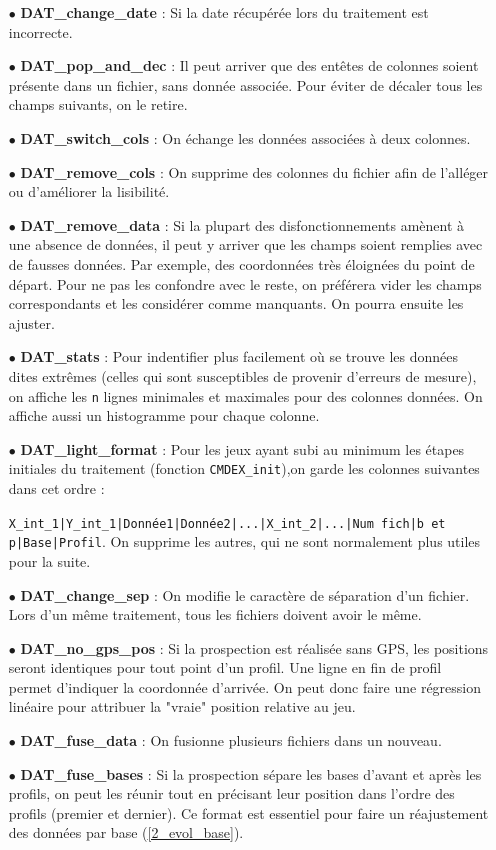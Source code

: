 \documentclass[12pt]{article}
\begin{document}
    \begin{enumerate}
        \item[$\bullet$] \textbf{DAT\_change\_date} : Si la date récupérée lors du traitement est incorrecte.
        \item[$\bullet$] \textbf{DAT\_pop\_and\_dec} : Il peut arriver que des entêtes de colonnes soient présente dans un fichier, sans donnée associée. Pour éviter de décaler tous les champs suivants, on le retire.
        \item[$\bullet$] \textbf{DAT\_switch\_cols} : On échange les données associées à deux colonnes.
        \item[$\bullet$] \textbf{DAT\_remove\_cols} : On supprime des colonnes du fichier afin de l'alléger ou d'améliorer la lisibilité.
        \item[$\bullet$] \textbf{DAT\_remove\_data} : Si la plupart des disfonctionnements amènent à une absence de données, il peut y arriver que les champs soient remplies avec de fausses données. Par exemple, des coordonnées très éloignées du point de départ. Pour ne pas les confondre avec le reste, on préférera vider les champs correspondants et les considérer comme manquants. On pourra ensuite les ajuster.
        \item[$\bullet$] \textbf{DAT\_stats} : Pour indentifier plus facilement où se trouve les données dites extrêmes (celles qui sont susceptibles de provenir d'erreurs de mesure), on affiche les \texttt{n} lignes minimales et maximales pour des colonnes données. On affiche aussi un histogramme pour chaque colonne.
        \item[$\bullet$] \textbf{DAT\_light\_format} : Pour les jeux ayant subi au minimum les étapes initiales du traitement (fonction \texttt{CMDEX\_init}),on garde les colonnes suivantes dans cet ordre : 
        
        \texttt{X\_int\_1|Y\_int\_1|Donnée1|Donnée2|...|X\_int\_2|...|Num fich|b et p|Base|Profil}. On supprime les autres, qui ne sont normalement plus utiles pour la suite.
        \item[$\bullet$] \textbf{DAT\_change\_sep} : On modifie le caractère de séparation d'un fichier. Lors d'un même traitement, tous les fichiers doivent avoir le même.
        \item[$\bullet$] \textbf{DAT\_no\_gps\_pos} : Si la prospection est réalisée sans GPS, les positions seront identiques pour tout point d'un profil. Une ligne en fin de profil permet d'indiquer la coordonnée d'arrivée. On peut donc faire une régression linéaire pour attribuer la "vraie" position relative au jeu.
        \item[$\bullet$] \textbf{DAT\_fuse\_data} : On fusionne plusieurs fichiers dans un nouveau. 
        \item[$\bullet$] \textbf{DAT\_fuse\_bases} : Si la prospection sépare les bases d'avant et après les profils, on peut les réunir tout en précisant leur position dans l'ordre des profils (premier et dernier). Ce format est essentiel pour faire un réajustement des données par base (\ref{2_evol_base}).
    \end{enumerate}
\end{document}
